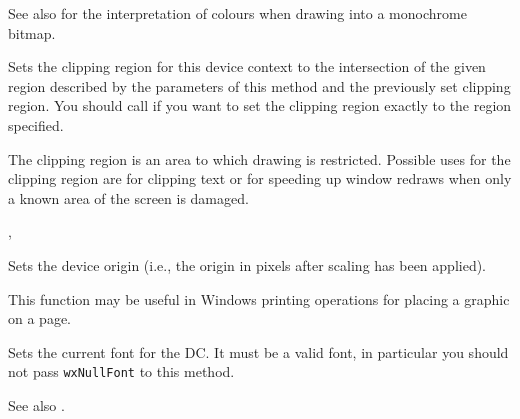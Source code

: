 See also  for the interpretation of colours
when drawing into a monochrome bitmap.

 
\label{wxdcsetclippingregion}





Sets the clipping region for this device context to the intersection of the
given region described by the parameters of this method and the previously set
clipping region. You should call 
 if you want to set
the clipping region exactly to the region specified.

The clipping region is an area to which drawing is restricted. Possible uses
for the clipping region are for clipping text or for speeding up window redraws
when only a known area of the screen is damaged.


, 


\label{wxdcsetdeviceorigin}


Sets the device origin (i.e., the origin in pixels after scaling has been
applied).

This function may be useful in Windows printing
operations for placing a graphic on a page.


\label{wxdcsetfont}


Sets the current font for the DC. It must be a valid font, in particular you
should not pass {\tt wxNullFont} to this method.

See also .


\label{wxdcsetlogicalfunction}


